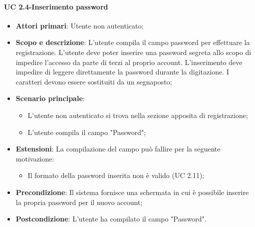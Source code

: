                 \paragraph{UC 2.4-Inserimento password}
                \begin{itemize}
                \item \textbf{Attori primari}: Utente non autenticato;
                
                \item \textbf{Scopo e descrizione}: L'utente compila il campo password per effettuare la registrazione. L’utente deve poter inserire una password segreta allo scopo di impedire l’accesso da parte di terzi al proprio account. L’inserimento deve impedire di leggere direttamente la password durante la digitazione. I caratteri devono essere sostituiti da un segnaposto; 
                \item \textbf{Scenario principale}: 
                    \begin{itemize}
                        \item L'utente non autenticato si trova nella sezione apposita di registrazione;
                        \item L'utente compila il campo "Password";
                    \end{itemize}
                \item \textbf{Estensioni}:  La compilazione del campo può fallire per la seguente motivazione:
                    \begin{itemize}
                        \item Il formato della password inserita non è valido (UC 2.11);
                    \end{itemize}
                \item \textbf{Precondizione}: Il sistema fornisce una schermata in cui è possibile inserire la propria password per il nuovo account;
                \item \textbf{Postcondizione}: L'utente ha compilato il campo "Password".
                \end{itemize}

                
